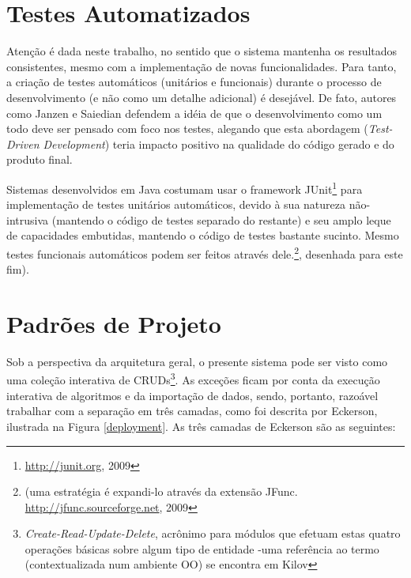 \documentclass{abnt}
\begin{document}
\section{Testes Automatizados}

	Atenção é dada neste trabalho, no sentido que o sistema mantenha os resultados consistentes, mesmo com a implementação de novas funcionalidades. Para tanto, a criação de testes automáticos (unitários e funcionais) durante o processo de desenvolvimento (e não como um detalhe adicional) é desejável. De fato, autores como Janzen e Saiedian\cite{Janzen_Saiedian} defendem a idéia de que o desenvolvimento como um todo deve ser pensado com foco nos testes, alegando que esta abordagem (\textit{Test-Driven Development}) teria impacto positivo na qualidade do código gerado e do produto final.

	Sistemas desenvolvidos em Java costumam usar o framework JUnit\footnote{\url{http://junit.org}, 2009} para implementação de testes unitários automáticos, devido à sua natureza não-intrusiva (mantendo o código de testes separado do restante) e seu amplo leque de capacidades embutidas, mantendo o código de testes bastante sucinto. Mesmo testes funcionais automáticos podem ser feitos através dele.\footnote{(uma estratégia é expandi-lo através da extensão JFunc. \url{http://jfunc.sourceforge.net}, 2009}, desenhada para este fim).

\section{Padrões de Projeto}

	Sob a perspectiva da arquitetura geral, o presente sistema pode ser visto como uma coleção interativa de CRUDs\footnote{\textit{Create-Read-Update-Delete}, acrônimo para módulos que efetuam estas quatro operações básicas sobre algum tipo de entidade -uma referência ao termo (contextualizada num ambiente OO) se encontra em Kilov\cite{kilov_crud}}. As exceções ficam por conta da execução interativa de algoritmos e da importação de dados, sendo, portanto, razoável trabalhar com a separação em três camadas, como foi  descrita por Eckerson\cite{Eckerson1995}, ilustrada na Figura \ref{deployment}. As três camadas de Eckerson são as seguintes:
\end{document}
